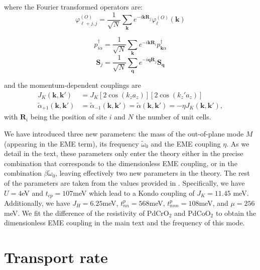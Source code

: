 \documentclass[aps,prl,twocolumn,superscriptaddress,amsmath,nofootinbib,10pt,floatfix]{revtex4-2}
\begin{document}
\begin{widetext}
where the Fourier transformed operators are:
\begin{equation}
\varphi^{(O)}_{\ell+j,j}=\frac{1}{\sqrt{N}}\sum_{\bm{k}}e^{-i\bm{k}\bm{R}_{j}}\varphi^{(O)}_{\ell}\left(\boldsymbol{k}\right)
\end{equation}

\begin{equation}
p_{i\alpha}^{\dagger}=\frac{1}{\sqrt{N}}\sum_{\bm{k}}e^{-i\bm{k}\bm{R}_{i}}p_{\boldsymbol{k}\alpha}^{\dagger}
\end{equation}
\begin{equation}
\boldsymbol{S}_{j}=\frac{1}{\sqrt{N}}\sum_{\bm{q}}e^{-i\bm{q}\bm{R}_{j}}\boldsymbol{S}_{\boldsymbol{q}}
\end{equation}

and the momentum-dependent couplings are 
\begin{align*}
J_{K}\left(\boldsymbol{k},\boldsymbol{k}'\right) & =J_{K}\left[2\cos\left(k_{z}a_{z}\right)\right]\left[2\cos\left(k_{z}'a_{z}\right)\right]\\
\tilde{\alpha}_{+1}\left(\boldsymbol{k},\boldsymbol{k}'\right) & =\tilde{\alpha}_{-1}\left(\boldsymbol{k},\boldsymbol{k}'\right)=\tilde{\alpha}\left(\boldsymbol{k},\boldsymbol{k}'\right)=-\eta J_{K}\left(\boldsymbol{k},\boldsymbol{k}'\right),
\end{align*}
with $\bm{R}_{i}$ being the position of site $i$ and $N$ the number
of unit cells. 

We have introduced three new parameters: the mass of the out-of-plane mode $M$ (appearing in the EME term), its frequency
$\tilde{\omega}_{0}$ and the EME coupling $\eta$. As we detail
in the text, these parameters only enter the theory either in the
precise combination that corresponds to the dimensionless EME coupling,
or in the combination $\beta\tilde{\omega}_{0}$, leaving effectively
two new parameters in the theory. The rest of the parameters are taken
from the values provided in \cite{sunko_probing_2020}. Specifically, we have $U=4$eV
and $t_{cp}=107$meV which lead to a Kondo coupling of $J_{K}=11.45$ meV.
Additionally, we have $J_{H}=6.25$meV, $t_{nn}^{p}=568$meV, $t_{nnn}^{p}=108$meV,
and $\mu=256$meV. We fit the difference
of the resistivity of PdCrO$_{2}$ and PdCoO$_{2}$ to obtain the
dimensionless EME coupling in the main text and the frequency of this mode. 

\section{Transport rate} \label{transport_rate}


\end{widetext}
\end{document}
